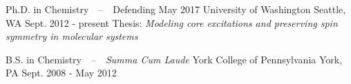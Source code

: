 


\begin{cventries}


\cventry
{Ph.D. in Chemistry~~--~~Defending May 2017} %
{University of Washington} %
{Seattle, WA} %
{Sept. 2012 - present} %
{Thesis: \textit{Modeling core excitations and preserving spin symmetry in molecular systems}}



\cventry
{B.S. in Chemistry~~--~~\textit{Summa Cum Laude}} %
{York College of Pennsylvania} %
{York, PA} %
{Sept. 2008 - May 2012} %
{}


\end{cventries}
